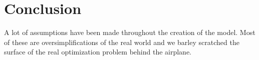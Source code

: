 \section{Conclusion}
A lot of assumptions have been made throughout the creation of the model.
Most of these are oversimplifications of the real world and we barley scratched the surface of the real optimization problem behind the airplane.


